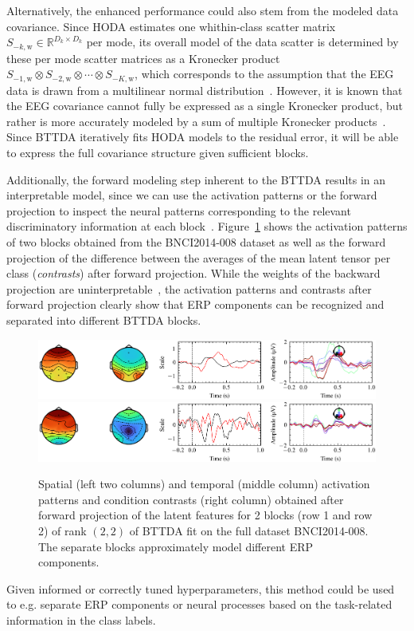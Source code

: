 Alternatively, the enhanced performance could also stem from the modeled data
covariance.
Since HODA estimates one whithin-class scatter matrix
$S_{-k,\text{w}}\in\mathbb{R}^{D_k\times D_k}$ per mode, its overall
model of the data scatter is determined by these per mode scatter matrices as a
Kronecker product $S_{-1,\text{w}}\otimes S_{-2,\text{w}}\otimes\cdots\otimes S_{-K,\text{w}}$, which corresponds to the assumption that the EEG data is
drawn from a multilinear normal distribution~\cite{Ohlson2013}.
However, it is known that the EEG covariance cannot fully be expressed as a
single Kronecker product, but rather is more accurately modeled by a sum of
multiple Kronecker products~\cite{Bijma2005, Sosulski2022}.
Since BTTDA iteratively fits HODA models to the residual error, it will be able
to express the full covariance structure given sufficient blocks.

Additionally, the forward modeling step inherent to the BTTDA results
in an interpretable model, since we can use the activation patterns or the
forward projection to inspect the neural patterns corresponding to the
relevant discriminatory information at each block~\cite{Haufe2014}.
Figure~\ref{fig:forward} shows the activation patterns
of two blocks obtained from the BNCI2014-008 dataset as well as the forward
projection of the difference between the averages of the mean latent tensor per
class (\emph{contrasts}) after forward projection.
While the weights of the backward projection are
uninterpretable~\cite{Haufe2014},
the activation patterns and contrasts after forward projection clearly show
that ERP components can be recognized and separated into different
BTTDA blocks.
\begin{figure}[t]
	\includegraphics[width=\linewidth]{figures/bttda/forward_block-0.png}
	\includegraphics[width=\linewidth]{figures/bttda/forward_block-1.png}
  \caption[Extracted \acs{bttda} activation patterns.]{%
    Spatial (left two columns) and temporal (middle column) activation patterns and
		condition contrasts (right column) obtained after forward projection of the latent
		features for 2 blocks (row 1 and row 2) of rank $(2,2)$ of BTTDA
		fit on the full dataset BNCI2014-008.
		The separate blocks approximately model different ERP
		components.}
	\label{fig:forward}
\end{figure}
Given informed or correctly tuned hyperparameters, this method could be used to
e.g. separate ERP components or neural processes based on the task-related
information in the class labels.

